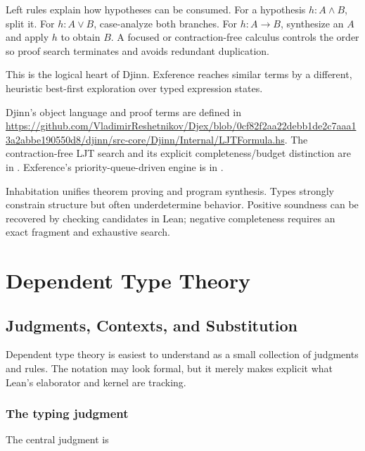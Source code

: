 \documentclass[10pt,letterpaper,oneside,openany]{report}
\begin{document}
Left rules explain how hypotheses can be consumed.  For a hypothesis $h:A\land B$, split it.  For $h:A\lor B$, case-analyze both branches.  For $h:A\to B$, synthesize an $A$ and apply $h$ to obtain $B$.  A focused or contraction-free calculus controls the order so proof search terminates and avoids redundant duplication.

This is the logical heart of Djinn.  Exference reaches similar terms by a different, heuristic best-first exploration over typed expression states.

\begin{sourcebox}
Djinn's object language and proof terms are defined in \url{https://github.com/VladimirReshetnikov/Djex/blob/0cf82f2aa22debb1de2c7aaa13a2abbe190550d8/djinn/src-core/Djinn/Internal/LJTFormula.hs}.  The contraction-free LJT search and its explicit completeness/budget distinction are in .  Exference's priority-queue-driven engine is in .
\end{sourcebox}

\begin{recapbox}
Inhabitation unifies theorem proving and program synthesis.  Types strongly constrain structure but often underdetermine behavior.  Positive soundness can be recovered by checking candidates in Lean; negative completeness requires an exact fragment and exhaustive search.
\end{recapbox}

\part{Dependent Type Theory}

\chapter{Judgments, Contexts, and Substitution}\label{ch:judgments}

Dependent type theory is easiest to understand as a small collection of judgments and rules.  The notation may look formal, but it merely makes explicit what Lean's elaborator and kernel are tracking.

\section{The typing judgment}

The central judgment is
\end{document}
